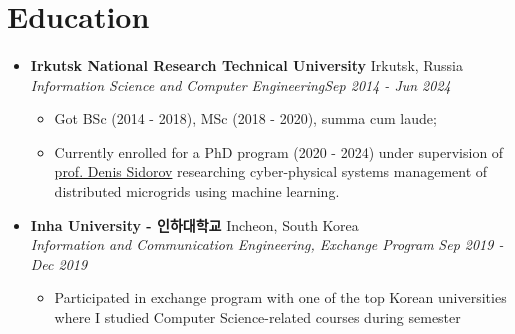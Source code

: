 \documentclass[10pt]{article}
\begin{document}

\section{Education}
\paragraph{}

\begin{itemize}[itemsep=4pt,topsep=0pt]
    \item \normalsize{\textbf{Irkutsk National Research Technical University}} \normalsize{\hfill Irkutsk, Russia 
    \\    \textit{ Information Science and Computer Engineering}\hfill \textit{Sep 2014 - Jun 2024}}
            \begin{itemize}[topsep=4pt] \normalsize

                \item {Got BSc (2014 - 2018), MSc (2018 - 2020), summa cum laude;}
                \item {Currently enrolled for a PhD program (2020 - 2024) under supervision of \href{http://www.mathnet.ru/eng/person17845}{prof. Denis Sidorov} researching cyber-physical systems management of distributed microgrids using machine learning.}
            \end{itemize}
        \item \normalsize{\textbf{Inha University - 인하대학교}} \normalsize{\hfill Incheon, South Korea 
    \\    \textit{ Information and Communication Engineering, Exchange Program }\hfill \textit{Sep 2019 - Dec 2019}}
            \begin{itemize}[itemsep=1pt,topsep=4pt] \normalsize
                \item{Participated in exchange program with one of the top Korean universities where I studied Computer Science-related courses during semester}
                    
            \end{itemize}
        \end{itemize}

\end{document}
